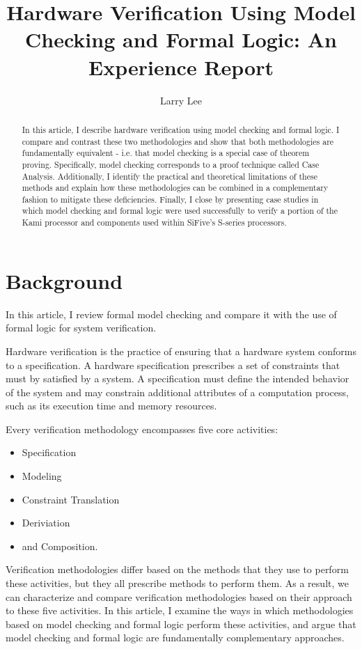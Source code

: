 \documentclass[10pt,a4paper]{article}
\author{Larry Lee}
\title{Hardware Verification Using Model Checking and Formal Logic: An Experience Report}
\begin{document}
\maketitle

\begin{abstract}
In this article, I describe hardware verification using model checking and formal logic. I compare and contrast these two methodologies and show that both methodologies are fundamentally equivalent - i.e. that model checking is a special case of theorem proving. Specifically, model checking corresponds to a proof technique called Case Analysis. Additionally, I identify the practical and theoretical limitations of these methods and explain how these methodologies can be combined in a complementary fashion to mitigate these deficiencies. Finally, I close by presenting case studies in which model checking and formal logic were used successfully to verify a portion of the Kami processor and components used within SiFive’s S-series processors.
\end{abstract}

\section{Background}

In this article, I review formal model checking and compare it with the use of formal logic for system verification.

Hardware verification is the practice of ensuring that a hardware system conforms to a specification. A hardware specification prescribes a set of constraints that must by satisfied by a system.  A specification must define the intended behavior of the system and may constrain additional attributes of a computation process, such as its execution time and memory resources.

Every verification methodology encompasses five core activities:
\begin{itemize}
\item Specification
\item Modeling
\item Constraint Translation
\item Deriviation
\item and Composition.
\end{itemize}

Verification methodologies differ based on the methods that they use to perform these activities, but they all prescribe methods to perform them. As a result, we can characterize and compare verification methodologies based on their approach to these five activities. In this article, I examine the ways in which methodologies based on model checking and formal logic perform these activities, and argue that model checking and formal logic are fundamentally complementary approaches.
\end{document}
